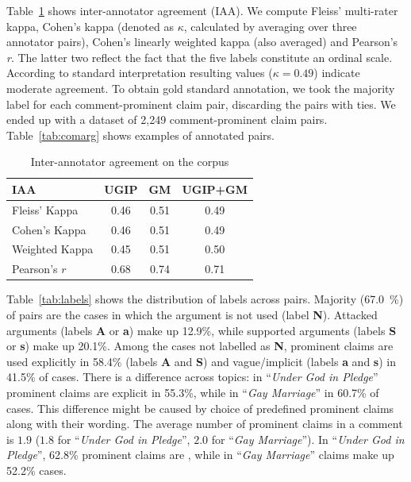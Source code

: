 Table~\ref{tab:iaa} shows inter-annotator agreement (IAA). 
We compute Fleiss' multi-rater kappa, Cohen's kappa (denoted as $\kappa$, calculated by
averaging over three annotator pairs), Cohen's linearly weighted kappa (also
averaged) and Pearson's \textit{r}.
The latter two reflect the fact that the five labels constitute an ordinal scale. 
According to standard interpretation \citep{landis1977measurement} resulting
values ($\kappa = 0.49$) indicate moderate agreement.
To obtain gold standard annotation, we took the majority label for 
each comment-prominent claim pair, discarding the pairs with ties. 
We ended up with a dataset of 2,249 comment-prominent claim pairs. 
Table~\ref{tab:comarg} shows examples of annotated pairs. 

\begin{table}
\centering
{\small
\begin{tabular}{l ccc}
\toprule
IAA & UGIP & GM & UGIP+GM \\
\midrule
Fleiss' Kappa    & 0.46 & 0.51 & 0.49 \\
Cohen's Kappa    & 0.46 & 0.51 & 0.49 \\
Weighted Kappa   & 0.45 & 0.51 &  0.50\\
Pearson's $r$    & 0.68 & 0.74 &  0.71 \\
\bottomrule
\end{tabular}}
\caption{Inter-annotator agreement on the \ComArg corpus}
\label{tab:iaa}
\end{table}


Table~\ref{tab:labels} shows the distribution of labels across pairs. 
Majority (67.0~\%) of pairs are the cases in which the argument is not used
(label \textbf{N}).
Attacked arguments (labels \textbf{A} or \textbf{a}) make up 12.9\%, while supported
arguments (labels \textbf{S} or \textbf{s}) make up 20.1\%.
Among the cases not labelled as \textbf{N}, prominent claims are used explicitly 
in 58.4\% (labels \textbf{A} and \textbf{S}) and vague/implicit (labels \textbf{a} and \textbf{s})
in 41.5\% of cases. 
There is a difference across topics: in ``\emph{Under God in Pledge}''
prominent claims are explicit in 55.3\%, while in 
``\emph{Gay Marriage}'' in 60.7\% of cases. 
This difference might be caused by 
choice of predefined prominent claims along with their 
wording.  
The average number of prominent claims in a comment is $1.9$ ($1.8$ for 
``\emph{Under God in Pledge}'', $2.0$ for ``\emph{Gay Marriage}''). 
In ``\emph{Under God in Pledge}'', 62.8\% prominent claims are ,
while in ``\emph{Gay Marriage}''  claims 
make up 52.2\% cases. 

